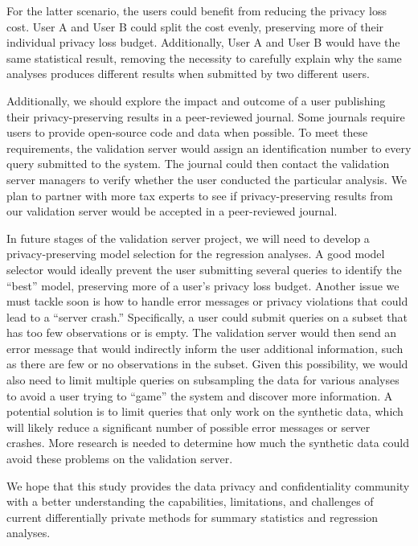 For the latter scenario, the users could benefit from reducing the privacy loss cost. User A and User B could split the cost evenly, preserving more of their individual privacy loss budget. Additionally, User A and User B would have the same statistical result, removing the necessity to carefully explain why the same analyses produces different results when submitted by two different users.

Additionally, we should explore the impact and outcome of a user publishing their privacy-preserving results in a peer-reviewed journal. Some journals require users to provide open-source code and data when possible. To meet these requirements, the validation server would assign an identification number to every query submitted to the system. The journal could then contact the validation server managers to verify whether the user conducted the particular analysis. We plan to partner with more tax experts to see if privacy-preserving results from our validation server would be accepted in a peer-reviewed journal.

In future stages of the validation server project, we will need to develop a privacy-preserving model selection for the regression analyses. A good model selector would ideally prevent the user submitting several queries to identify the ``best'' model, preserving more of a user's privacy loss budget. Another issue we must tackle soon is how to handle error messages or privacy violations that could lead to a ``server crash.'' Specifically, a user could submit queries on a subset that has too few observations or is empty. The validation server would then send an error message that would indirectly inform the user additional information, such as there are few or no observations in the subset. Given this possibility, we would also need to limit multiple queries on subsampling the data for various analyses to avoid a user trying to ``game'' the system and discover more information. A potential solution is to limit queries that only work on the synthetic data, which will likely reduce a significant number of possible error messages or server crashes. More research is needed to determine how much the synthetic data could avoid these problems on the validation server.

We hope that this study provides the data privacy and confidentiality community with a better understanding the capabilities, limitations, and challenges of current differentially private methods for summary statistics and regression analyses. 